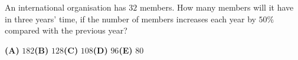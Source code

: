 An international organisation has $32$ members. How many members will it have in three years' time, if the number of members increases each year by $50\%$ compared with the previous year?

\textbf{(A)} $182$\qquad\textbf{(B)} $128$\qquad\textbf{(C)} $108$\qquad\textbf{(D)} $96$\qquad\textbf{(E)} $80$
